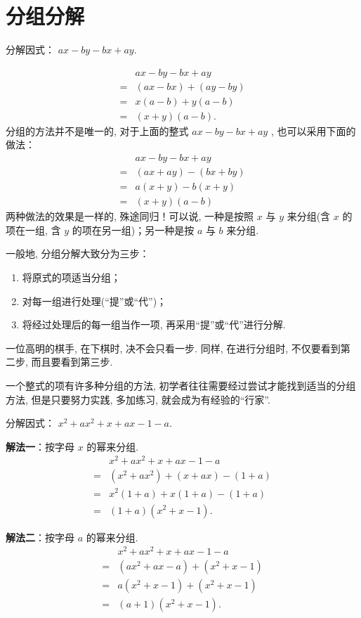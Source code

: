 \section{分组分解}
\begin{example}[分组分解三部曲]
	分解因式： $a x-b y-b x+a y .$
\end{example}
\begin{solution}
	\begin{align*}
		  & a x-b y-b x+a y     \\
		= & (a x-b x)+(a y-b y) \\
		= & x(a-b)+y(a-b)       \\
		= & (x+y)(a-b) .
	\end{align*}
	分组的方法并不是唯一的, 对于上面的整式 $a x-b y-b x+a y$ , 也可以采用下面的做法：
	\begin{align*}
		  & a x-b y-b x+a y     \\
		= & (a x+a y)-(b x+b y) \\
		= & a(x+y)-b(x+y)       \\
		= & (x+y)(a-b)
	\end{align*}
	两种做法的效果是一样的, 殊途同归！可以说, 一种是按照 $x$ 与 $y$ 来分组(含 $x$ 的项在一组, 含 $y$ 的项在另一组)；另一种是按 $a$ 与 $b$ 来分组.
\end{solution}
一般地, 分组分解大致分为三步：
\begin{enumerate}
	\item 将原式的项适当分组；
	\item 对每一组进行处理(“提”或“代”)；
	\item 将经过处理后的每一组当作一项, 再采用“提”或“代”进行分解.
\end{enumerate}
一位高明的棋手, 在下棋时, 决不会只看一步. 同样, 在进行分组时, 不仅要看到第二步, 而且要看到第三步. 

一个整式的项有许多种分组的方法, 初学者往往需要经过尝试才能找到适当的分组方法, 但是只要努力实践, 多加练习, 就会成为有经验的“行家”.

\begin{example}[殊途同归]
	分解因式： $x^{2}+a x^{2}+x+a x-1-a$.
\end{example}
\begin{solution}
	\textbf{解法一}：按字母 $x$ 的幂来分组.
	\begin{align*}
		  & x^{2}+a x^{2}+x+a x-1-a                  \\
		= & \left(x^{2}+a x^{2}\right)+(x+a x)-(1+a) \\
		= & x^{2}(1+a)+x(1+a)-(1+a)                  \\
		= & (1+a)\left(x^{2}+x-1\right) .
	\end{align*}

	\textbf{解法二}：按字母 $a$ 的幂来分组.
	\begin{align*}
		  & x^{2}+a x^{2}+x+a x-1-a                           \\
		= & \left(a x^{2}+a x-a\right)+\left(x^{2}+x-1\right) \\
		= & a\left(x^{2}+x-1\right)+\left(x^{2}+x-1\right)    \\
		= & (a+1)\left(x^{2}+x-1\right) .
	\end{align*}
\end{solution}

